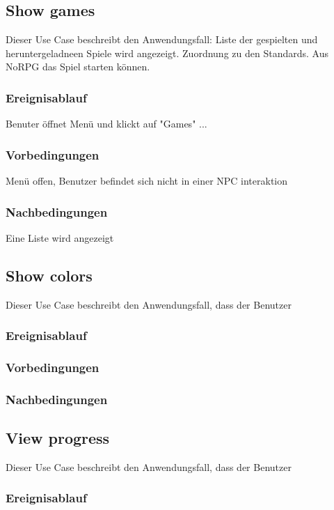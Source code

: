 	\subsection{Show games}
		Dieser Use Case beschreibt den Anwendungsfall: Liste der gespielten und heruntergeladneen Spiele wird angezeigt. Zuordnung zu den Standards. Aus NoRPG das Spiel starten können.
			
		\subsubsection{Ereignisablauf}
			Benuter öffnet Menü und klickt auf "Games" ...

		\subsubsection{Vorbedingungen}
			Menü offen, Benutzer befindet sich nicht in einer NPC interaktion
			
		\subsubsection{Nachbedingungen}
			Eine Liste wird angezeigt
	
	\subsection{Show colors}
		Dieser Use Case beschreibt den Anwendungsfall, dass der Benutzer 
			
		\subsubsection{Ereignisablauf}

		\subsubsection{Vorbedingungen}
			
		\subsubsection{Nachbedingungen}
	
	\subsection{View progress}
		Dieser Use Case beschreibt den Anwendungsfall, dass der Benutzer 
			
		\subsubsection{Ereignisablauf}
	
